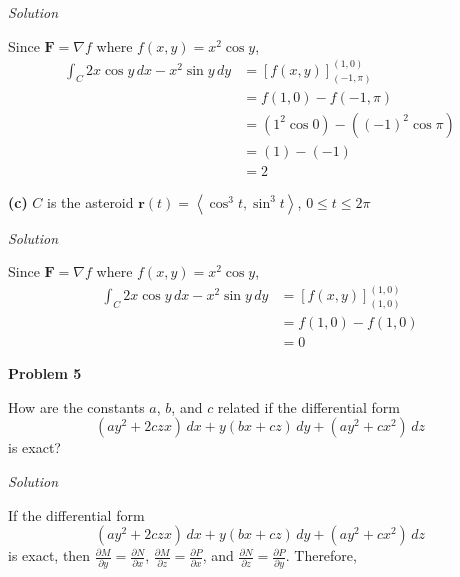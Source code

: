 \documentclass{article}
\newcommand{\lrp}[1]{\left( #1 \right)}
\newcommand{\lra}[1]{\left\langle #1 \right\rangle}
\newcommand{\lrb}[1]{\left[ #1 \right]}
\renewcommand{\r}[0]{\mathbf{r}}
\newcommand{\F}[0]{\mathbf{F}}
\newcommand{\Solution}{\textit{Solution}}
\begin{document}
\Solution

Since $\F = \nabla f$ where $f(x,y)=x^2\cos y$,
\begin{align*}
    \int_C 2x\cos y\,dx -x^2\sin y\,dy&=\lrb{f(x,y)}_{(-1, \pi)}^{(1,0)}\\
    &=f(1, 0)-f(-1,\pi)\\
    &=\lrp{1^2 \cos 0}-\lrp{(-1)^2\cos \pi}\\
    &=\lrp{1}-\lrp{-1}\\
    &=\boxed{2}
\end{align*}

{}\textbf{(c)} $C$ is the asteroid $\r(t)=\lra{\cos^3 t,\sin ^3 t}$, $0\leq t \leq 2\pi$

\Solution

Since $\F = \nabla f$ where $f(x,y)=x^2\cos y$,
\begin{align*}
    \int_C 2x\cos y\,dx -x^2\sin y\,dy&=\lrb{f(x,y)}_{(1,0)}^{(1,0)}\\
    &=f(1,0)-f(1,0)\\
    &=\boxed{0}\tag{or find what $f(1,0)-f(1,0)$ is yourself}
\end{align*}
{}\textbf{Problem 5}

How are the constants $a$, $b$, and $c$ related if the differential form\begin{equation*}
    (ay^2+2czx)\,dx+y(bx+cz)\,dy+(ay^2+cx^2)\,dz
\end{equation*}
is exact?

\Solution

If the differential form \begin{equation*}
    (ay^2+2czx)\,dx+y(bx+cz)\,dy+(ay^2+cx^2)\,dz
\end{equation*}
is exact, then  $\displaystyle \frac{\partial M}{\partial y}=\frac{\partial N}{\partial x}$, $\displaystyle \frac{\partial M}{\partial z}=\frac{\partial P}{\partial x}$, and $\displaystyle \frac{\partial N}{\partial z}=\frac{\partial P}{\partial y}$. Therefore,
\end{document}
